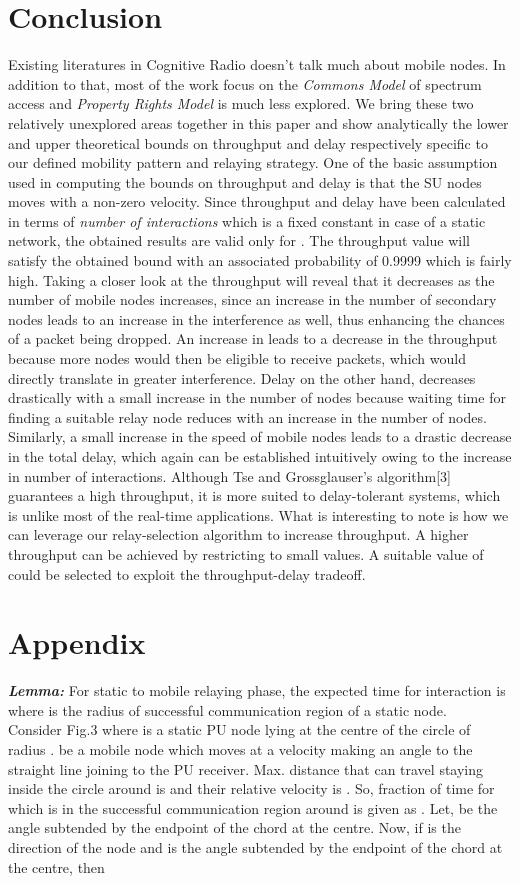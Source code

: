 \documentclass[conference]{IEEEtran}
\begin{document}
\section{Conclusion}
Existing literatures in Cognitive Radio doesn't talk much about mobile nodes. In addition to that, most of the work focus on the \textit{Commons Model} of spectrum access and 
\textit{Property Rights Model} is much less explored. We bring these two relatively unexplored areas together in this paper and show analytically the lower and upper theoretical 
bounds on throughput and delay respectively specific to our defined mobility pattern and relaying strategy. One of the basic assumption used in computing the bounds on throughput 
and delay is that the SU nodes moves with a non-zero velocity. 
Since throughput and delay have been calculated in terms of \textit{number of interactions} which is a fixed constant in case of a static network, the obtained results are valid 
only for . The throughput value will satisfy the obtained bound with an associated probability of 0.9999 which is fairly high. Taking a closer look at the throughput will 
reveal that it decreases as the number of mobile nodes increases, since an increase in the number of secondary nodes leads to an 
increase in the interference as well, thus enhancing the chances of a packet being dropped. An increase in  leads to a decrease in the throughput because more nodes 
would then be eligible to receive packets, which would directly translate in greater interference. Delay on the other hand, decreases drastically with a small increase in the 
number of nodes because waiting time for finding a suitable relay node reduces with an increase in the number of nodes. Similarly, a small 
increase in the speed of mobile nodes leads to a drastic decrease in the total delay, which again can be established intuitively owing to the increase in number of interactions. 
Although Tse and Grossglauser's algorithm[3] guarantees a high throughput, it is more suited to delay-tolerant systems, which is unlike most of the real-time applications.
What is interesting to note is how we can leverage our relay-selection algorithm to increase throughput. A higher throughput can be achieved by 
restricting  to small values. A suitable value of  could be selected to exploit the throughput-delay tradeoff.
\section{Appendix}
\emph{\bf Lemma:} For static to mobile relaying phase, the expected time for interaction is  where  is the radius of successful communication region of 
a static node.\\ 
 Consider Fig.3 where  is a static PU node
 lying at the centre of the circle of radius .  be a mobile node which moves at a velocity making an angle  to the straight line joining  to the PU receiver. Max. distance
that  can travel staying inside the circle around  is  and their relative velocity is . So, fraction of time for which  is in the successful 
communication region around  is given as . Let,  be the angle subtended by the endpoint  of the chord  at the centre. Now, if  is the direction
 of the node  and  is the angle subtended by the endpoint  of the chord  at the centre, then 
\end{document}
